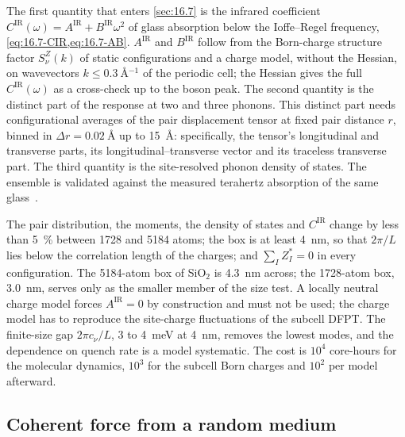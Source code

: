 The first quantity that enters \cref{sec:16.7} is the infrared coefficient $C^{\mathrm{IR}}(\omega) = A^{\mathrm{IR}} + B^{\mathrm{IR}}\omega^2$ of glass absorption below the Ioffe--Regel frequency, \cref{eq:16.7-CIR,eq:16.7-AB}. $A^{\mathrm{IR}}$ and $B^{\mathrm{IR}}$ follow from the Born-charge structure factor $S^Z_\nu(k)$ of static configurations and a charge model, without the Hessian, on wavevectors $k \le \SI{0.3}{\angstrom^{-1}}$ of the periodic cell; the Hessian gives the full $C^{\mathrm{IR}}(\omega)$ as a cross-check up to the boson peak. The second quantity is the distinct part of the response at two and three phonons. This distinct part needs configurational averages of the pair displacement tensor at fixed pair distance $r$, binned in $\Delta r = \SI{0.02}{\angstrom}$ up to \SI{15}{\angstrom}: specifically, the tensor's longitudinal and transverse parts, its longitudinal--transverse vector and its traceless transverse part. The third quantity is the site-resolved phonon density of states. The ensemble is validated against the measured terahertz absorption of the same glass~\cite{taraskin2006universal}.

The pair distribution, the moments, the density of states and $C^{\mathrm{IR}}$ change by less than \SI{5}{\percent} between 1728 and 5184 atoms; the box is at least \SI{4}{nm}, so that $2\pi/L$ lies below the correlation length of the charges; and $\sum_I Z^*_I = 0$ in every configuration. The 5184-atom box of SiO$_2$ is \SI{4.3}{nm} across; the 1728-atom box, \SI{3.0}{nm}, serves only as the smaller member of the size test. A locally neutral charge model forces $A^{\mathrm{IR}} = 0$ by construction and must not be used; the charge model has to reproduce the site-charge fluctuations of the subcell DFPT. The finite-size gap $2\pi c_\nu/L$, 3 to \SI{4}{meV} at \SI{4}{nm}, removes the lowest modes, and the dependence on quench rate is a model systematic. The cost is $10^4$ core-hours for the molecular dynamics, $10^3$ for the subcell Born charges and $10^2$ per model afterward.

\subsection{Coherent force from a random medium}

